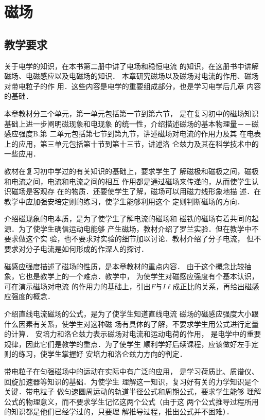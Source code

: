 
\chapter{磁场}
\minitoc[n]
\section{教学要求}
关于电学的知识，在本书第二册中讲了电场和稳恒电流
的知识，在这册书中讲解磁场、电磁感应以及电磁场的知识．
本章研究磁场以及磁场对电流的作用、磁场对带电粒子的作
用．这些内容是电学的重要组成部分，也是学习电学后几章
内容的基础．

本章教材分三个单元，第一单元包括第一节到第六节，
是在复习初中的磁场知识基础上进一步阐明磁现象和电现象
的统一性，介绍描述磁场的基本物理量－－磁感应强度B.第
二单元包括第七节到第九节，讲述磁场对电流的作用力及其
在电表上的应用，第三单元包括第十节到第十三节，讲述洛
仑兹力及其在科学技术中的一些应用．

教材在复习初中学过的有关知识的基础上，要求学生了
解磁极和磁极之间，磁极和电流之间，电流和电流之间的相互
作用都是通过磁场来传递的，从而使学生认识磁场是客观存
在的物质．还要使学生了解，磁场可以用磁力线形象地描
述．在教学中应加强安培定则的练习，使学生能够利用这个
定则判断磁场的方向．

介绍磁现象的电本质，是为了使学生了解电流的磁场和
磁铁的磁场有着共同的起源．为了使学生确信运动电能够
产生磁场，教材介绍了罗兰实验．但在教学中不要求做这个实
验，也不要求对实验的细节加以讨论．教材介绍了分子电流，
但不要求对分子电流是如何形成的作深人的探讨．

磁感应强度描述了磁场的性质，是本章教材的重点内容．
由于这个概念比较抽象，它也是教学上的一个难点．教学中，
为使学生对磁感应强度有个基本认识，可在演示磁场对电流
的作用力的基础上，引出$F$与$I\ell$成正比的关系，再给出磁感
应强度的概念．

介绍直线电流磁场的公式，是为了使学生知道直线电流
磁场的磁感应强度大小跟什么因素有关系，使学生对这种磁
场有具体的了解，不要求学生用公式进行定量的计算．
安培力和洛仑兹力表示磁场对电流和运动电荷的作用，
是电学中的重要规律，因此它们是教学的重点．为了使学生
顺利学好后续课程，应该做好左手定则的练习，使学生掌握好
安培力和洛仑兹力方向的判定．

带电粒子在匀强磁场中的运动在实际中有广泛的应用，
是学习荷质比、质谱仪、回旋加速器等知识的基础．为使学生
理解这一知识，复习好有关的力学知识是个关键．带电粒子
做匀速圆周运动的轨道半径公式和周期公式，要求学生能够
理解公式的物理意义，而不要求学生记忆这两个公式（由于这
两个公式推导过程所用的知识都是他们已经学过的，只要理
解推导过程，推出公式并不困难）．

